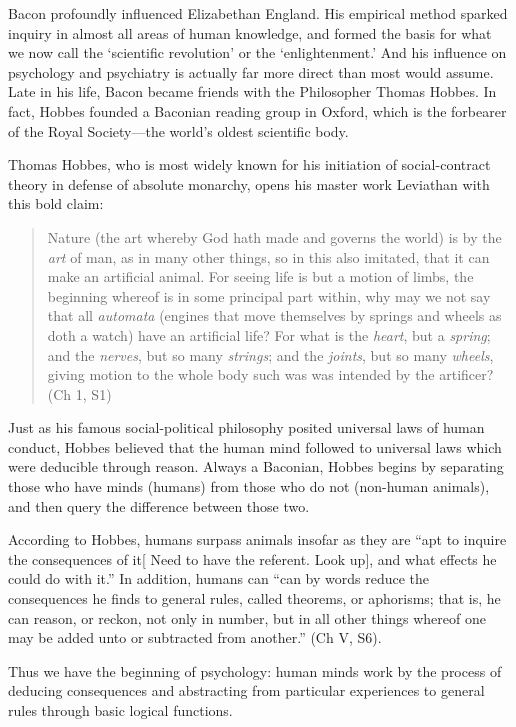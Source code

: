 Bacon profoundly influenced Elizabethan England. His empirical method sparked inquiry in almost all areas of human knowledge, and formed the basis for what we now call the `scientific revolution' or the `enlightenment.' And his influence on psychology and psychiatry is actually far more direct than most would assume. Late in his life, Bacon became friends with the Philosopher Thomas Hobbes. In fact, Hobbes founded a Baconian reading group in Oxford, which is the forbearer of the Royal Society---the world's oldest scientific body.

Thomas Hobbes, who is most widely known for his initiation of social-contract theory in defense of absolute monarchy, opens his master work Leviathan with this bold claim:

\begin{quote}

Nature (the art whereby God hath made and governs the world) is by the \emph{art} of man, as in many other things, so in this also imitated, that it can make an artificial animal. For seeing life is but a motion of limbs, the beginning whereof is in some principal part within, why may we not say that all \emph{automata} (engines that move themselves by springs and wheels as doth a watch) have an artificial life? For what is the \emph{heart}, but a \emph{spring}; and the \emph{nerves}, but so many \emph{strings}; and the \emph{joints}, but so many \emph{wheels}, giving motion to the whole body such was was intended by the artificer? (Ch 1, S1)
\end{quote}

Just as his famous social-political philosophy posited universal laws of human conduct, Hobbes believed that the human mind followed to universal laws which were deducible through reason. Always a Baconian, Hobbes begins by separating those who have minds (humans) from those who do not (non-human animals), and then query the difference between those two.

According to Hobbes, humans surpass animals insofar as they are ``apt to inquire the consequences of it[ Need to have the referent. Look up], and what effects he could do with it.'' In addition, humans can ``can by words reduce the consequences he finds to general rules, called theorems, or aphorisms; that is, he can reason, or reckon, not only in number, but in all other things whereof one may be added unto or subtracted from another.'' (Ch V, S6). 

Thus we have the beginning of psychology: human minds work by the process of deducing consequences and abstracting from particular experiences to general rules through basic logical functions. 

